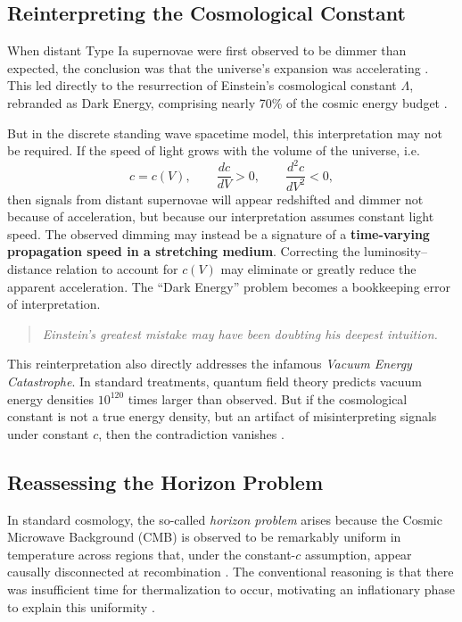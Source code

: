 \documentclass[12pt]{article}
\begin{document}
\subsection{Reinterpreting the Cosmological Constant}

When distant Type Ia supernovae were first observed to be dimmer than expected, the conclusion was that the universe’s expansion was accelerating \citep{perlmutter1999, riess1998}. This led directly to the resurrection of Einstein’s cosmological constant \( \Lambda \), rebranded as Dark Energy, comprising nearly 70\% of the cosmic energy budget \citep{planck2018}.

But in the discrete standing wave spacetime model, this interpretation may not be required. If the speed of light grows with the volume of the universe, i.e.
\begin{equation}
  c = c(V), \qquad \frac{dc}{dV} > 0, \qquad \frac{d^2c}{dV^2} < 0,
\end{equation}
then signals from distant supernovae will appear redshifted and dimmer not because of acceleration, but because our interpretation assumes constant light speed. The observed dimming may instead be a signature of a \textbf{time-varying propagation speed in a stretching medium}. Correcting the luminosity–distance relation to account for \(c(V)\) may eliminate or greatly reduce the apparent acceleration. The ``Dark Energy'' problem becomes a bookkeeping error of interpretation.

\begin{quote}
\textit{Einstein’s greatest mistake may have been doubting his deepest intuition.}
\end{quote}

This reinterpretation also directly addresses the infamous \textit{Vacuum Energy Catastrophe}. In standard treatments, quantum field theory predicts vacuum energy densities \(10^{120}\) times larger than observed. But if the cosmological constant is not a true energy density, but an artifact of misinterpreting signals under constant \(c\), then the contradiction vanishes \citep{weinberg1989}.

\subsection{Reassessing the Horizon Problem}

In standard cosmology, the so-called \emph{horizon problem} arises because the Cosmic Microwave Background (CMB) is observed to be remarkably uniform in temperature across regions that, under the constant-$c$ assumption, appear causally disconnected at recombination \cite{smoot1992}. The conventional reasoning is that there was insufficient time for thermalization to occur, motivating an inflationary phase to explain this uniformity \cite{liddle2000}.
\end{document}
